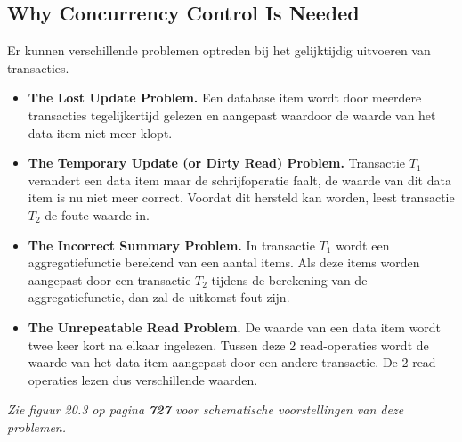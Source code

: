 \subsection{Why Concurrency Control Is Needed}
Er kunnen verschillende problemen optreden bij het gelijktijdig uitvoeren van transacties.
\begin{itemize}
	\item \textbf{The Lost Update Problem.} Een database item wordt door meerdere transacties tegelijkertijd gelezen en aangepast waardoor de waarde van het data item niet meer klopt.
	\item \textbf{The Temporary Update (or Dirty Read) Problem.} Transactie $T_1$ verandert een data item maar de schrijfoperatie faalt, de waarde van dit data item is nu niet meer correct. Voordat dit hersteld kan worden, leest transactie $T_2$ de foute waarde in.
	\item \textbf{The Incorrect Summary Problem.} In transactie $T_1$ wordt een aggregatiefunctie berekend van een aantal items. Als deze items worden aangepast door een transactie $T_2$ tijdens de berekening van de aggregatiefunctie, dan zal de uitkomst fout zijn.
	\item \textbf{The Unrepeatable Read Problem.} De waarde van een data item wordt twee keer kort na elkaar ingelezen. Tussen deze 2 read-operaties wordt de waarde van het data item aangepast door een andere transactie. De 2 read-operaties lezen dus verschillende waarden.
\end{itemize}
\textit{Zie figuur 20.3 op pagina \textbf{727} voor schematische voorstellingen van deze problemen.}


